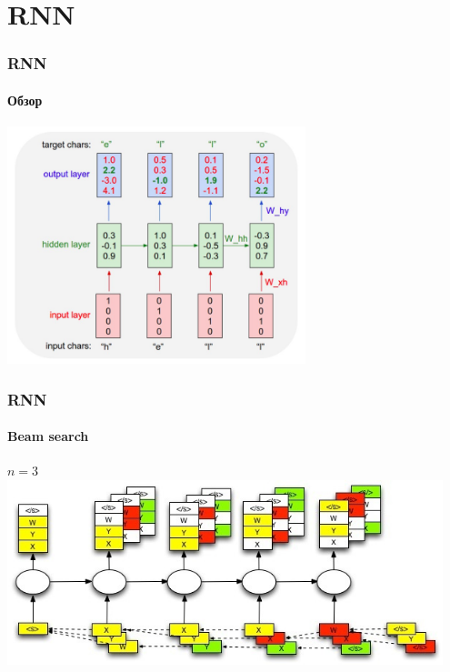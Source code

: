 \documentclass[10pt]{beamer}
\begin{document}
\section{RNN}
\begin{frame}
\frametitle{RNN}
\framesubtitle{Обзор}

\begin{center}
    \includegraphics[width=0.65\textwidth]{images/rnn.png}
\end{center}

\end{frame}
\begin{frame}
\frametitle{RNN}
\framesubtitle{Beam search}

\begin{center}
    $n = 3$ \\
    \includegraphics[width=0.95\textwidth]{images/beam_search.jpeg}
\end{center}

\end{frame}
\end{document}
